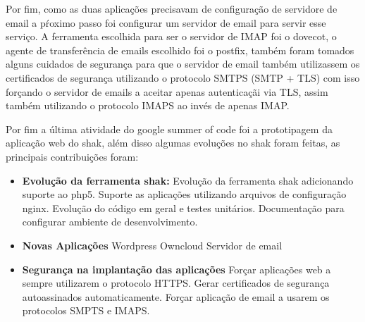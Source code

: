 Por fim, como as duas aplicações precisavam de configuração de servidore de email
a pŕoximo passo foi configurar um servidor de email para servir esse serviço. A
ferramenta escolhida para ser o servidor de IMAP foi o dovecot, o agente de
transferência de emails escolhido foi o postfix, também foram tomados alguns
 cuidados de segurança para que o servidor de email também utilizassem os certificados
 de segurança utilizando o protocolo SMTPS (SMTP + TLS) com isso forçando o servidor
 de emails a aceitar apenas autenticaçãi via TLS, assim também utilizando o
 protocolo IMAPS ao invés de apenas IMAP.

Por fim a última atividade do google summer of code foi a prototipagem da aplicação
web do shak, além disso algumas evoluções no shak foram feitas, as principais
contribuições foram:

\begin{itemize}
  \item  \textbf{Evolução da ferramenta shak:}
  \subitem Evolução da ferramenta shak adicionando suporte ao php5.
  \subitem Suporte as aplicações utilizando arquivos de configuração nginx.
  \subitem Evolução do código em geral e testes unitários.
  \subitem Documentação para configurar ambiente de desenvolvimento.

  \item  \textbf{Novas Aplicações}
  \subitem Wordpress
  \subitem Owncloud
  \subitem Servidor de email

  \item  \textbf{Segurança na implantação das aplicações}
  \subitem Forçar aplicações web a sempre utilizarem o protocolo HTTPS.
  \subitem Gerar certificados de segurança autoassinados automaticamente.
  \subitem Forçar aplicação de email a usarem os protocolos SMPTS e IMAPS.
\end{itemize}
